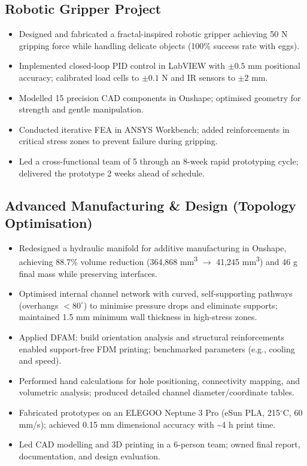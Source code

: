 \documentclass[11pt,a4paper]{article}
\begin{document}
\subsection{Robotic Gripper Project}
\begin{itemize}
    \item Designed and fabricated a fractal-inspired robotic gripper achieving 50 N gripping force while handling delicate objects (100\% success rate with eggs).
    \item Implemented closed-loop PID control in LabVIEW with $\pm 0.5$ mm positional accuracy; calibrated load cells to $\pm 0.1$ N and IR sensors to $\pm 2$ mm.
    \item Modelled 15 precision CAD components in Onshape; optimised geometry for strength and gentle manipulation.
    \item Conducted iterative FEA in ANSYS Workbench; added reinforcements in critical stress zones to prevent failure during gripping.
    \item Led a cross-functional team of 5 through an 8-week rapid prototyping cycle; delivered the prototype 2 weeks ahead of schedule.
\end{itemize}

\subsection{Advanced Manufacturing \& Design (Topology Optimisation)}
\begin{itemize}
    \item Redesigned a hydraulic manifold for additive manufacturing in Onshape, achieving 88.7\% volume reduction (364,868 mm\textsuperscript{3} $\rightarrow$ 41,245 mm\textsuperscript{3}) and 46 g final mass while preserving interfaces.
    \item Optimised internal channel network with curved, self-supporting pathways (overhangs $< 80^\circ$) to minimise pressure drops and eliminate supports; maintained 1.5 mm minimum wall thickness in high-stress zones.
    \item Applied DFAM: build orientation analysis and structural reinforcements enabled support-free FDM printing; benchmarked parameters (e.g., cooling and speed).
    \item Performed hand calculations for hole positioning, connectivity mapping, and volumetric analysis; produced detailed channel diameter/coordinate tables.
    \item Fabricated prototypes on an ELEGOO Neptune 3 Pro (eSun PLA, 215$^\circ$C, 60 mm/s); achieved 0.15 mm dimensional accuracy with \textasciitilde 4 h print time.
    \item Led CAD modelling and 3D printing in a 6-person team; owned final report, documentation, and design evaluation.
\end{itemize}
\end{document}
